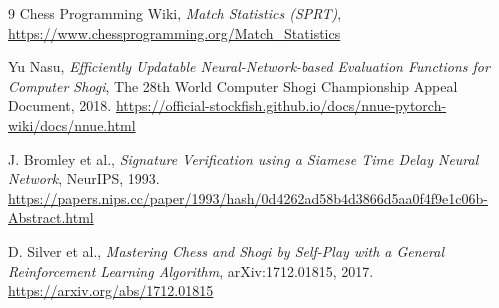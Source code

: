 \documentclass[12pt,a4paper]{article}
\begin{document}
\begin{thebibliography}{9}
Chess Programming Wiki,
\textit{Match Statistics (SPRT)},
\url{https://www.chessprogramming.org/Match_Statistics}

Yu Nasu, \textit{Efficiently Updatable Neural-Network-based Evaluation Functions for Computer Shogi},
The 28th World Computer Shogi Championship Appeal Document, 2018.
\url{https://official-stockfish.github.io/docs/nnue-pytorch-wiki/docs/nnue.html}

J. Bromley et al.,
\textit{Signature Verification using a Siamese Time Delay Neural Network},
NeurIPS, 1993.
\url{https://papers.nips.cc/paper/1993/hash/0d4262ad58b4d3866d5aa0f4f9e1c06b-Abstract.html}

D. Silver et al.,
\textit{Mastering Chess and Shogi by Self-Play with a General Reinforcement Learning Algorithm},
arXiv:1712.01815, 2017.
\url{https://arxiv.org/abs/1712.01815}

\end{thebibliography}
\end{document}
